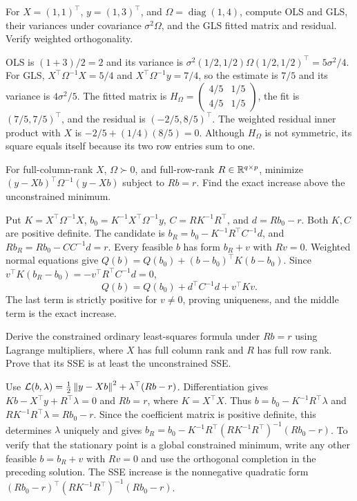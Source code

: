 \begin{problem}
For $X=(1,1)^\top$, $y=(1,3)^\top$, and $\Omega=\operatorname{diag}(1,4)$,
compute OLS and GLS, their variances under covariance $\sigma^2\Omega$,
and the GLS fitted matrix and residual. Verify weighted orthogonality.
\end{problem}
\begin{solution}
OLS is $(1+3)/2=2$ and its variance is
$\sigma^2(1/2,1/2)\Omega(1/2,1/2)^\top=5\sigma^2/4$.
For GLS, $X^\top\Omega^{-1}X=5/4$ and
$X^\top\Omega^{-1}y=7/4$, so the estimate is $7/5$ and its variance
is $4\sigma^2/5$.
The fitted matrix is $H_\Omega=\begin{pmatrix}4/5&1/5\\4/5&1/5\end{pmatrix}$,
the fit is $(7/5,7/5)^\top$, and the residual is $(-2/5,8/5)^\top$.
The weighted residual inner product with $X$ is
$-2/5+(1/4)(8/5)=0$. Although $H_\Omega$ is not symmetric, its square
equals itself because its two row entries sum to one.
\end{solution}

\begin{problem}\label{ex:11:constraint}
For full-column-rank $X$, $\Omega\succ0$, and full-row-rank
$R\in\mathbb R^{q\times p}$, minimize
$(y-Xb)^\top\Omega^{-1}(y-Xb)$ subject to $Rb=r$.
Find the exact increase above the unconstrained minimum.
\end{problem}
\begin{solution}
Put $K=X^\top\Omega^{-1}X$, $b_0=K^{-1}X^\top\Omega^{-1}y$,
$C=RK^{-1}R^\top$, and $d=Rb_0-r$. Both $K,C$ are positive definite.
The candidate is $b_R=b_0-K^{-1}R^\top C^{-1}d$, and
$Rb_R=Rb_0-CC^{-1}d=r$.
Every feasible $b$ has form $b_R+v$ with $Rv=0$. Weighted normal
equations give $Q(b)=Q(b_0)+(b-b_0)^\top K(b-b_0)$.
Since $v^\top K(b_R-b_0)=-v^\top R^\top C^{-1}d=0$,
\[
Q(b)=Q(b_0)+d^\top C^{-1}d+v^\top Kv.
\]
The last term is strictly positive for $v\ne0$, proving uniqueness,
and the middle term is the exact increase.
\end{solution}

\begin{problem}
Derive the constrained ordinary least-squares formula under $Rb=r$
using Lagrange multipliers, where $X$ has full column rank and $R$ has
full row rank. Prove that its SSE is at least the unconstrained SSE.
\end{problem}
\begin{solution}
Use $\mathcal L(b,\lambda)=\frac12\left\lVert y-Xb\right\rVert^2+\lambda^\top(Rb-r)$.
Differentiation gives $Kb-X^\top y+R^\top\lambda=0$ and $Rb=r$,
where $K=X^\top X$. Thus $b=b_0-K^{-1}R^\top\lambda$ and
$RK^{-1}R^\top\lambda=Rb_0-r$. Since the coefficient matrix is positive
definite, this determines $\lambda$ uniquely and gives
$b_R=b_0-K^{-1}R^\top(RK^{-1}R^\top)^{-1}(Rb_0-r)$.
To verify that the stationary point is a global constrained minimum,
write any other feasible $b=b_R+v$ with $Rv=0$ and use the orthogonal
completion in the preceding solution. The SSE increase is the
nonnegative quadratic form
$(Rb_0-r)^\top(RK^{-1}R^\top)^{-1}(Rb_0-r)$.
\end{solution}

